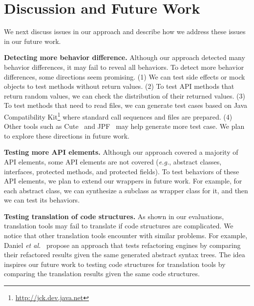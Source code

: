 

\section{Discussion and Future Work}
\label{sec:discuss}

We next discuss issues in our approach and describe how we address
these issues in our future work.

\textbf{Detecting more behavior difference.} Although our approach detected many behavior differences, it may fail to reveal all behaviors. To detect more behavior differences, some directions seem promising. (1) We can test side effects or  mock objects to test methods without return values. (2) To test API methods that return random values, we can check the distribution of their returned values. (3) To test methods that need to read files, we can generate test cases based on Java Compatibility Kit\footnote{\url{http://jck.dev.java.net}} where standard call sequences and files are prepared. (4) Other tools such as Cute~\cite{koushik:cute} and JPF~\cite{visser2003mcp} may help generate more test case. We plan to explore these directions in future work.

\textbf{Testing more API elements.} Although our approach covered a majority of API elements, some API elements are not covered (\emph{e.g.}, abstract classes, interfaces, protected methods, and protected fields). To test behaviors of these API elements, we plan to extend our wrappers in future work. For example, for each abstract class, we can synthesize a subclass as wrapper class for it, and then we can test its behaviors.

\textbf{Testing translation of code structures.} As shown in our evaluations, translation tools may fail to translate if code structures are complicated. We notice that other translation tools encounter with similar problems. For example, Daniel \emph{et al.}~\cite{daniel2007automated} propose an approach that tests refactoring engines by comparing their refactored results given the same generated abstract syntax trees. The idea inspires our future work to testing code structures for translation tools by comparing the translation results given the same code structures.

